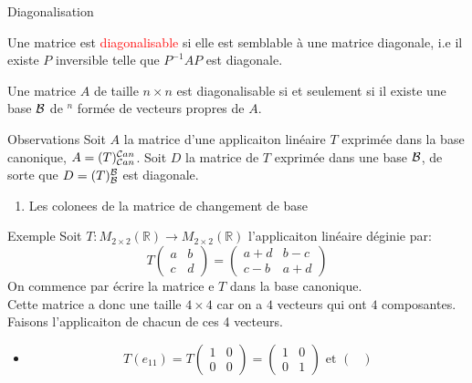 \begin{parag}{Diagonalisation}
    \begin{definition}
        Une matrice est \textcolor{red}{diagonalisable} si elle est semblable à une matrice diagonale, i.e il existe $P$ inversible telle que $P^{-1}AP$ est diagonale.
    \end{definition}
    \begin{theoreme}
        Une matrice $A$ de taille $n\times n$ est diagonalisable si et seulement si il existe une base $\mathcal{B}$ de \R$^n$ formée de vecteurs propres de $A$.
    \end{theoreme}
    \begin{subparag}{Observations}
        Soit $A$ la matrice d'une applicaiton linéaire $T$ exprimée dans la base canonique, $A = (T)_{\mathcal{C} an}^{\mathcal{C} an}$. Soit $D$ la matrice  de $T$ exprimée dans une base $\mathcal{B}$, de sorte que $D = (T)_{\mathcal{B}}^{\mathcal{B}}$ est diagonale.
        \begin{enumerate}
            \item Les colonees de la matrice de changement de base 
        \end{enumerate}
    \end{subparag}
    \begin{subparag}{Exemple}
        Soit $T: M_{2\times 2}(\mathbb{R}) \to M_{2\times 2}(\mathbb{R})$ l'applicaiton linéaire déginie par:
        \[T\begin{pmatrix}
            a & b \\ c & d
        \end{pmatrix} = \begin{pmatrix}
            a + d & b - c\\ c-b & a + d
        \end{pmatrix}\]
        On commence par écrire la matrice e $T$ dans la base canonique.
        \\
        Cette matrice a donc une taille $4 \times 4$ car on a $4$ vecteurs qui ont $4$ composantes. Faisons l'applicaiton de chacun de ces 4 vecteurs.
        \begin{itemize}
            \item \[T(e_{11}) = T\begin{pmatrix}
                1 & 0 \\ 0 & 0
            \end{pmatrix} = \begin{pmatrix}
                1 & 0 \\ 0 & 1
            \end{pmatrix} \text{ et } \begin{pmatrix}

\end{pmatrix}\]
\end{itemize}
\end{subparag}
\end{parag}
